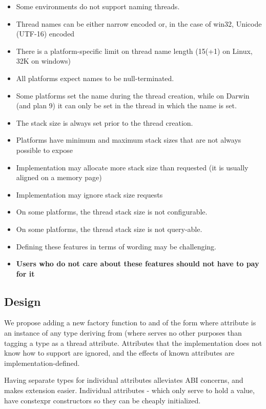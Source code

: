 \documentclass{wg21}
\begin{document}
\begin{itemize}
\item Some environments do not support naming threads.
\item Thread names can be either narrow encoded or, in the case of win32, Unicode (UTF-16) encoded
\item There is a platform-specific limit on thread name length (15(+1) on Linux, 32K on windows)
\item All platforms expect names to be null-terminated.
\item Some platforms set the name during the thread creation, while on Darwin (and plan 9) it can only be set in the thread in which the name is set.
\item The stack size is always set prior to the thread creation.
\item Platforms have minimum and maximum stack sizes that are not always possible to expose
\item Implementation may allocate more stack size than requested (it is usually aligned on a memory page)
\item Implementation may ignore stack size requests
\item On some platforms, the thread stack size is not configurable.
\item On some platforms, the thread stack size is not query-able.
\item Defining these features in terms of wording may be challenging.
\item \textbf{Users who do not care about these features should not have to pay for it}
\end{itemize}

\subsection{Design}

We propose adding a new factory function to  and 
of the form  where attribute is
an instance of any type deriving from  (where   serves no
other purposes than tagging a type as a thread attribute. Attributes that the implementation does not know how to support
are ignored, and the effects of known attributes are implementation-defined.

Having separate types for individual attributes alleviates ABI concerns, and makes extension easier.
Individual attributes - which only serve to hold a value, have constexpr constructors so they can be cheaply initialized.
\end{document}
